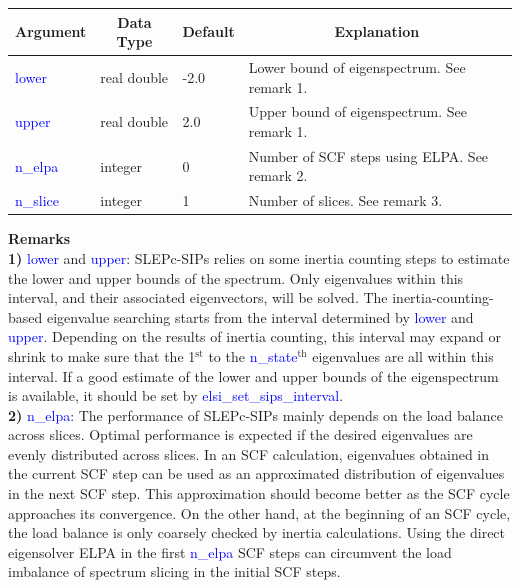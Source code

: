 \documentclass{report}
\begin{document}
\begin{tabular}[]{|p{30mm}|p{20mm}|p{15mm}|p{100mm}|}
\hline
\multicolumn{1}{|c|}{\textbf{Argument}} & \multicolumn{1}{c|}{\textbf{Data Type}} & \multicolumn{1}{c|}{\textbf{Default}} & \multicolumn{1}{c|}{\textbf{Explanation}}\\
\hline
\textcolor{blue}{lower}    & real double & -2.0 & Lower bound of eigenspectrum.  See remark 1.\\
\hline
\textcolor{blue}{upper}    & real double & 2.0  & Upper bound of eigenspectrum.  See remark 1.\\
\hline
\textcolor{blue}{n\_elpa}  & integer     & 0    & Number of SCF steps using ELPA.  See remark 2.\\
\hline
\textcolor{blue}{n\_slice} & integer     & 1    & Number of slices.  See remark 3.\\
\hline
\end{tabular}

\bigskip
\textbf{Remarks}\\

\textbf{1)} \textcolor{blue}{lower} and \textcolor{blue}{upper}:  SLEPc-SIPs relies on some inertia counting steps to estimate the lower and upper bounds of the spectrum.  Only eigenvalues within this interval, and their associated eigenvectors, will be solved.  The inertia-counting-based eigenvalue searching starts from the interval determined by \textcolor{blue}{lower} and \textcolor{blue}{upper}.  Depending on the results of inertia counting, this interval may expand or shrink to make sure that the 1$^\text{st}$ to the \textcolor{blue}{n\_state}$^\text{th}$ eigenvalues are all within this interval.  If a good estimate of the lower and upper bounds of the eigenspectrum is available, it should be set by \textcolor{blue}{elsi\_set\_sips\_interval}.\\

\textbf{2)} \textcolor{blue}{n\_elpa}:  The performance of SLEPc-SIPs mainly depends on the load balance across slices.  Optimal performance is expected if the desired eigenvalues are evenly distributed across slices.  In an SCF calculation, eigenvalues obtained in the current SCF step can be used as an approximated distribution of eigenvalues in the next SCF step.  This approximation should become better as the SCF cycle approaches its convergence.  On the other hand, at the beginning of an SCF cycle, the load balance is only coarsely checked by inertia calculations.  Using the direct eigensolver ELPA in the first \textcolor{blue}{n\_elpa} SCF steps can circumvent the load imbalance of spectrum slicing in the initial SCF steps.\\
\end{document}
